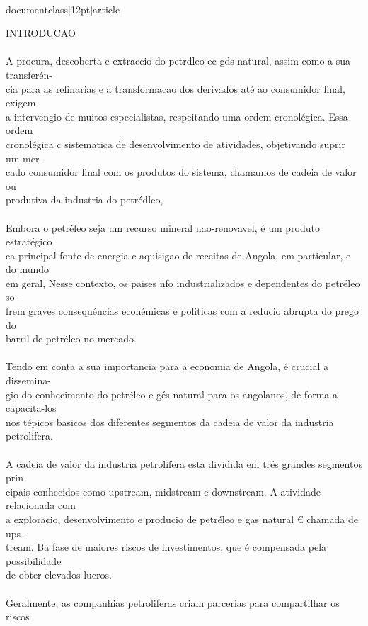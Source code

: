 \\documentclass[12pt]{article}
\begin{document}
{INTRODUCAO\\
\\
A procura, descoberta e extrac¢io do petrdleo e¢ gds natural, assim como a sua transferén-\\
cia para as refinarias e a transformacao dos derivados até ao consumidor final, exigem\\
a intervengio de muitos especialistas, respeitando uma ordem cronolégica. Essa ordem\\
cronolégica ¢ sistematica de desenvolvimento de atividades, objetivando suprir um mer-\\
cado consumidor final com os produtos do sistema, chamamos de cadeia de valor ou\\
produtiva da industria do petrédleo,\\
\\
Embora o petréleo seja um recurso mineral nao-renovavel, é um produto estratégico\\
ea principal fonte de energia ¢ aquisigao de receitas de Angola, em particular, e do mundo\\
em geral, Nesse contexto, os paises nfo industrializados e dependentes do petréleo so-\\
frem graves consequéncias econémicas e politicas com a reducio abrupta do prego do\\
barril de petréleo no mercado.\\
\\
Tendo em conta a sua importancia para a economia de Angola, é crucial a dissemina-\\
gio do conhecimento do petréleo e gés natural para os angolanos, de forma a capacita-los\\
nos tépicos basicos dos diferentes segmentos da cadeia de valor da industria petrolifera.\\
\\
A cadeia de valor da industria petrolifera esta dividida em trés grandes segmentos prin-\\
cipais conhecidos como upstream, midstream e downstream. A atividade relacionada com\\
a explora¢io, desenvolvimento e producio de petréleo e gas natural € chamada de ups-\\
tream. Ba fase de maiores riscos de investimentos, que é compensada pela possibilidade\\
de obter elevados lucros.\\
\\
Geralmente, as companhias petroliferas criam parcerias para compartilhar os riscos\\
}
\end{document}
